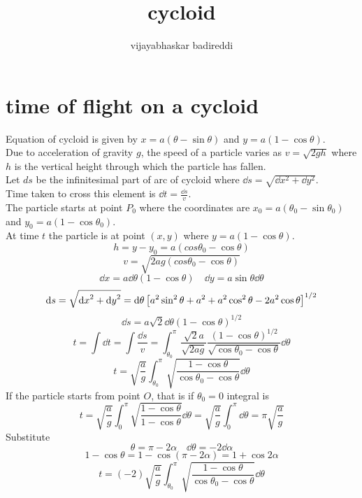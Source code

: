 \documentclass[12pt]{article}
\title{cycloid}
\author{vijayabhaskar badireddi}
\begin{document}

\section*{time of flight on a cycloid}
Equation of cycloid is given by $x=a(\theta-\sin\theta)$ and $y=a(1-\cos\theta)$. \\
Due to acceleration of gravity $g$, the speed of a particle varies as $v=\sqrt{2gh}$ where $h$ is the vertical height through which the particle has fallen.\\
Let $ds$ be the infinitesimal part of arc of cycloid where $\dd{s}=\sqrt{\dd{x}^2+\dd{y}^2}$.\\
Time taken to cross this element is $\dd{t}=\frac{\dd{s}}{v}$.\\
The particle starts at point $P_0$ where the coordinates are $x_0=a(\theta_0-\sin\theta_0)$ and $y_0=a(1-\cos\theta_0)$.\\
At time $t$ the particle is at point $(x,y)$ where $y=a(1-\cos\theta)$.
\[h=y-y_0=a(cos\theta_0-\cos\theta)\]
\[v=\sqrt{2ag(cos\theta_0-\cos\theta)}\]
\[\dd{x}=a\dd\theta(1-\cos\theta)\quad\dd{y}=a\sin\theta\dd{\theta}\]
\[\dd{s}=\sqrt{\dd{x}^2+\dd{y}^2}=\dd{\theta}\qty[a^2\sin^2\theta+a^2+a^2\cos^2\theta-2a^2\cos\theta]^{1/2}\]
\[\dd{s}=a\sqrt{2}\dd{\theta}(1-\cos\theta)^{1/2}\]
\[t=\int\dd{t}=\int\frac{\dd{s}}{v}=\int_{\theta_0}^{\pi}\frac{\sqrt{2}a}{\sqrt{2ag}}\frac{(1-\cos\theta)^{1/2}}{\sqrt{\cos\theta_0-\cos\theta}}\dd\theta\]
\[t=\sqrt{\frac{a}{g}}\int_{\theta_0}^{\pi}\sqrt{\frac{1-\cos\theta}{\cos\theta_0-\cos\theta}}\dd{\theta}\]
If the particle starts from point $O$, that is if $\theta_0=0$ integral is \[t=\sqrt{\frac{a}{g}}\int_{0}^{\pi}\sqrt{\frac{1-\cos\theta}{1-\cos\theta}}\dd{\theta}=\sqrt{\frac{a}{g}}\int_{0}^{\pi}\dd{\theta}=\pi\sqrt{\frac{a}{g}}\]
Substitute \[\theta=\pi-2\alpha\quad\dd\theta=-2\dd\alpha\]
\[1-\cos\theta=1-\cos(\pi-2\alpha)=1+\cos{2\alpha}\]
\[t=(-2)\sqrt{\frac{a}{g}}\int_{\theta_0}^{\pi}\sqrt{\frac{1-\cos\theta}{\cos\theta_0-\cos\theta}}\dd{\theta}\]
\end{document}

